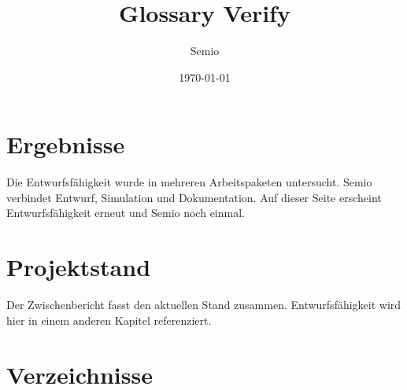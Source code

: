 \documentclass[type=report,theme=light,language=de]{semio}
\title{Glossary Verify}
\author{Semio}
\date{\today}
\begin{document}
\maketitle

\chapter{Ergebnisse}
Die \Gls{Entwurfsfähigkeit} wurde in mehreren Arbeitspaketen untersucht.
\Gls{Semio} verbindet Entwurf, Simulation und Dokumentation.
Auf dieser Seite erscheint \Gls{Entwurfsfähigkeit} erneut und \Gls{Semio} noch einmal.

\chapter{Projektstand}
Der \Gls{Zwischenbericht} fasst den aktuellen Stand zusammen.
\Gls{Entwurfsfähigkeit} wird hier in einem anderen Kapitel referenziert.

\appendix
\chapter{Verzeichnisse}
\listofglossaries
\end{document}
